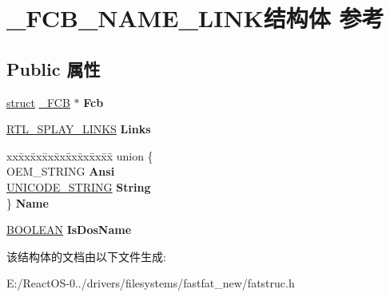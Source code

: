\hypertarget{struct___f_c_b___n_a_m_e___l_i_n_k}{}\section{\+\_\+\+F\+C\+B\+\_\+\+N\+A\+M\+E\+\_\+\+L\+I\+N\+K结构体 参考}
\label{struct___f_c_b___n_a_m_e___l_i_n_k}
\subsection*{Public 属性}
\begin{DoxyCompactItemize}
\item 
\mbox{\label{struct___f_c_b___n_a_m_e___l_i_n_k_a7efa84e4602613d41b58612efba388ab}} 
\hyperlink{interfacestruct}{struct} \hyperlink{struct___f_c_b}{\+\_\+\+F\+CB} $\ast$ {\bfseries Fcb}
\item 
\mbox{\label{struct___f_c_b___n_a_m_e___l_i_n_k_a9d278b359e740fb83aabbe39dcfbfe53}} 
\hyperlink{struct___r_t_l___s_p_l_a_y___l_i_n_k_s}{R\+T\+L\+\_\+\+S\+P\+L\+A\+Y\+\_\+\+L\+I\+N\+KS} {\bfseries Links}
\item 
\mbox{\label{struct___f_c_b___n_a_m_e___l_i_n_k_a90d4307ab99f5428c0784b310b28b496}} 
\begin{tabbing}
xx\=xx\=xx\=xx\=xx\=xx\=xx\=xx\=xx\=\kill
union \{\\
\>OEM\_STRING {\bfseries Ansi}\\
\>\hyperlink{struct___u_n_i_c_o_d_e___s_t_r_i_n_g}{UNICODE\_STRING} {\bfseries String}\\
\} {\bfseries Name}\\

\end{tabbing}\item 
\mbox{\label{struct___f_c_b___n_a_m_e___l_i_n_k_acc68e0230ac6ee4f2e213d82b3c302cb}} 
\hyperlink{_processor_bind_8h_a112e3146cb38b6ee95e64d85842e380a}{B\+O\+O\+L\+E\+AN} {\bfseries Is\+Dos\+Name}
\end{DoxyCompactItemize}


该结构体的文档由以下文件生成\+:\begin{DoxyCompactItemize}
\item 
E\+:/\+React\+O\+S-\/0../drivers/filesystems/fastfat\+\_\+new/fatstruc.\+h\end{DoxyCompactItemize}
